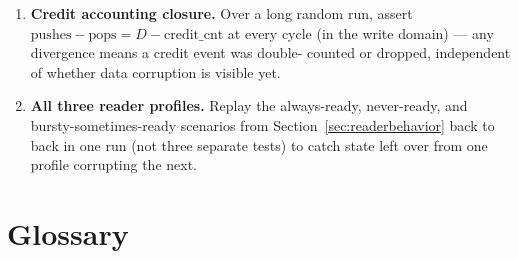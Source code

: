 \documentclass[12pt]{article}
\begin{document}
\begin{enumerate}[leftmargin=1.4em]
  full wraps (push/pop counts $\gg 2^{N}$) and confirm the wrap-bit compare
  keeps distinguishing full from empty correctly lap after lap — this is
  the one most likely to silently regress if someone "simplifies" the
  pointer width back to \texttt{[N-1:0]}.
  \item \textbf{Credit accounting closure.} Over a long random run, assert
  $\text{pushes} - \text{pops} = D - \text{credit\_cnt}$ at every cycle (in
  the write domain) — any divergence means a credit event was double-
  counted or dropped, independent of whether data corruption is visible
  yet.
  \item \textbf{All three reader profiles.} Replay the always-ready,
  never-ready, and bursty-sometimes-ready scenarios from
  Section~\ref{sec:readerbehavior} back to back in one run (not three
  separate tests) to catch state left over from one profile corrupting
  the next.
\end{enumerate}

\clearpage
\section*{Glossary}
\end{document}
